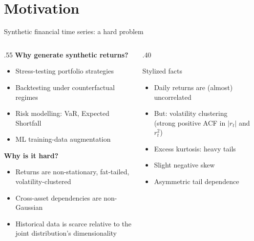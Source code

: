 
\section{Motivation}
\label{sec:motivation}
\frame[plain]{\sectionpage}

\begin{frame}{Synthetic financial time series: a hard problem}
    \begin{columns}[T]
    \begin{column}{.55\textwidth}
        \textbf{Why generate synthetic returns?}
        \begin{itemize}
            \item Stress-testing portfolio strategies
            \item Backtesting under counterfactual regimes
            \item Risk modelling: VaR, Expected Shortfall
            \item ML training-data augmentation
        \end{itemize}
        \medskip

        \textbf{Why is it hard?}
        \begin{itemize}
            \item Returns are non-stationary, fat-tailed,
            volatility-clustered
            \item Cross-asset dependencies are non-Gaussian
            \item Historical data is scarce relative to the
            joint distribution's dimensionality
        \end{itemize}
    \end{column}
    \hfill
    \begin{column}{.40\textwidth}
        \begin{block}{Stylized facts}
            \begin{itemize}
                \item Daily returns are (almost) uncorrelated
                \item But: volatility clustering (strong positive ACF in $|r_t|$ and $r_t^2$)
                \item Excess kurtosis: heavy tails
                \item Slight negative skew
                \item Asymmetric tail dependence
            \end{itemize}
        \end{block}
    \end{column}
    \end{columns}
\end{frame}

